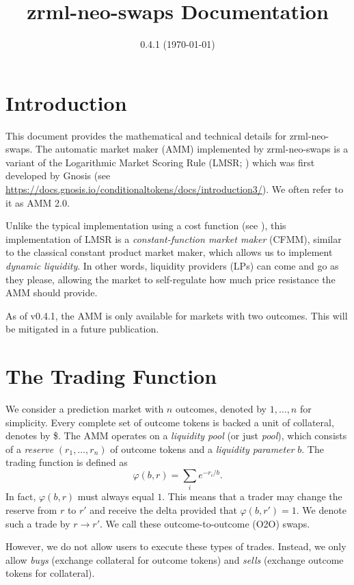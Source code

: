 \documentclass[12pt]{article}
\title{zrml-neo-swaps Documentation}
\date{0.4.1 (\today)}
\begin{document}
\maketitle

\section{Introduction}

This document provides the mathematical and technical details for zrml-neo-swaps. The automatic market maker (AMM) implemented by zrml-neo-swaps is a variant of the Logarithmic Market Scoring Rule (LMSR; \cite{hanson_2003}) which was first developed by Gnosis (see \url{https://docs.gnosis.io/conditionaltokens/docs/introduction3/}). We often refer to it as AMM 2.0.

Unlike the typical implementation using a cost function (see \cite{chen_vaughan_2010}), this implementation of LMSR is a \emph{constant-function market maker} (CFMM), similar to the classical constant product market maker, which allows us to implement \emph{dynamic liquidity}. In other words, liquidity providers (LPs) can come and go as they please, allowing the market to self-regulate how much price resistance the AMM should provide.

As of v0.4.1, the AMM is only available for markets with two outcomes. This will be mitigated in a future publication.

\section{The Trading Function}

We consider a prediction market with $n$ outcomes, denoted by $1, \ldots, n$ for simplicity. Every complete set of outcome tokens is backed a unit of collateral, denotes by \$. The AMM operates on a \emph{liquidity pool} (or just \emph{pool}), which consists of a \emph{reserve} $(r_1, \ldots, r_n)$ of outcome tokens and a \emph{liquidity parameter} $b$. The trading function is defined as
\[
    \varphi(b, r) = \sum_i e^{-r_i/b}.
\]
In fact, $\varphi(b, r)$ must always equal $1$. This means that a trader may change the reserve from $r$ to $r'$ and receive the delta provided that $\varphi(b, r') = 1$. We denote such a trade by $r \rightarrow r'$. We call these outcome-to-outcome (O2O) swaps.

However, we do not allow users to execute these types of trades. Instead, we only allow \emph{buys} (exchange collateral for outcome tokens) and \emph{sells} (exchange outcome tokens for collateral).
\end{document}
